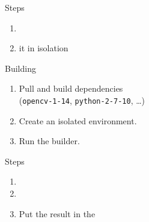 \documentclass[aspectratio=169]{beamer}
\newcommand{\couleur}[2]{{\color{#1}{#2}}}
\begin{document}
\begin{frame}
    \begin{block}{Steps}
        \begin{enumerate}
            \item \couleur{dark-grey}{Describe a package and its
                dependencies in full}
            \item
                \couleur{blue-portage}{Build} it in isolation
        \end{enumerate}
    \end{block}
\end{frame}

\begin{frame}{Building}
    \couleur{green-pea}{gh-from-shoe-1.0\$}\ \couleur{blue-marguerite}{nix build}
    \begin{enumerate}
        \item Pull and build dependencies\\
            (\lstinline+opencv-1-14+, \lstinline+python-2-7-10+, \ldots)
        \item Create an isolated environment.
        \item Run the builder.
    \end{enumerate}
\end{frame}

\begin{frame}
    \begin{block}{Steps}
        \begin{enumerate}
            \item
                \couleur{dark-grey}{Describe a package and its
                dependencies in full}
            \item
                \couleur{dark-grey}{Build it in isolation}
            \item
                Put the result in the
                \couleur{orange-vivid-tangerine}{store}
        \end{enumerate}
    \end{block}
\end{frame}
\end{document}
